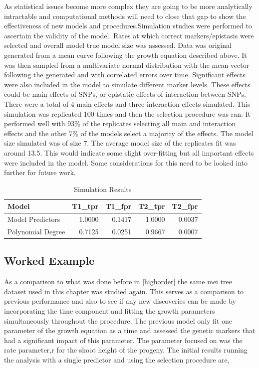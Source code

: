 \documentclass[11pt,]{book}
\theoremstyle{definition}
\theoremstyle{definition}
\theoremstyle{remark}
\begin{document}
As statistical issues become more complex they are going to be more
analytically intractable and computational methods will need to close
that gap to show the effectiveness of new models and
procedures.Simulation studies were performed to ascertain the validity
of the model. Rates at which correct markers/epistasis were selected and
overall model true model size was assessed. Data was original generated
from a mean curve following the growth equation described above. It was
then sampled from a multivariate normal distribution with the mean
vector following the generated and with correlated errors over time.
Significant effects were also included in the model to simulate
different marker levels. These effects could be main effects of SNPs, or
epistatic effects of interaction between SNPs. There were a total of 4
main effects and three interaction effects simulated. This simulation
was replicated 100 times and then the selection procedure was ran. It
performed well with 93\% of the replicates selecting all main and
interaction effects and the other 7\% of the models select a majority of
the effects. The model size simulated was of size 7. The average model
size of the replicates fit was around 13.5. This would indicate some
slight over-fitting but all important effects were included in the
model. Some considerations for this need to be looked into further for
future work.

\begin{table}

\caption{\label{tab:Chap4SimResults}Simulation Results}
\centering
\begin{tabular}[t]{l|r|r|r|r}
\hline
Model & T1\_tpr & T1\_fpr & T2\_tpr & T2\_fpr\\
\hline
Model Predictors & 1.0000 & 0.1417 & 1.0000 & 0.0037\\
\hline
Polynomial Degree & 0.7125 & 0.0251 & 0.9667 & 0.0007\\
\hline
\end{tabular}
\end{table}

\subsection{Worked Example}\label{worked-example-1}

As a comparison to what was done before in \ref{highorder} the same mei
tree dataset used in this chapter was studied again. This serves as a
comparison to previous performance and also to see if any new
discoveries can be made by incorporating the time component and fitting
the growth parameters simultaneously throughout the procedure. The
previous model only fit one parameter of the growth equation as a time
and assessed the genetic markers that had a significant impact of this
parameter. The parameter focused on was the rate parameter,r for the
shoot height of the progeny. The initial results running the analysis
with a single predictor and using the selection procedure are,
\end{document}
